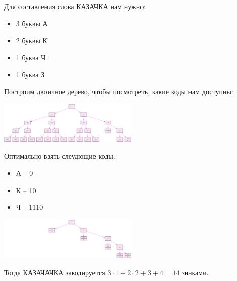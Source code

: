 \documentclass[14pt,a4paper]{article}
\begin{document}
Для составления слова КАЗАЧКА нам нужно:
\begin{itemize}
    \item 3 буквы А \\
    \item 2 буквы К \\
    \item 1 буква Ч \\
    \item 1 буква З \\
\end{itemize}

Построим двоичное дерево, чтобы посмотреть, какие коды нам доступны:
\begin{center}
    \includegraphics[width=0.5\textwidth]{tree_all.png}
\end{center}

Оптимально взять слеудющие коды:
\begin{itemize}
    \item А -- 0 \\
    \item К -- 10 \\
    \item Ч -- 1110 \\
\end{itemize}
\begin{center}
    \includegraphics[width=0.5\textwidth]{tree_sol.png}
\end{center}

Тогда КАЗАЧАЧКА закодируется
$3 \cdot 1 + 2 \cdot 2 + 3 + 4 = 14$
знаками.
\end{document}
